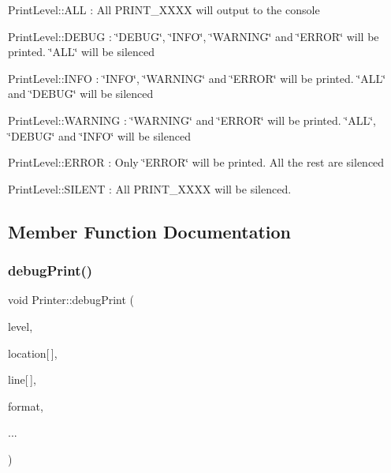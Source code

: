 \begin{DoxyItemize}
\item Print\+Level\+::\+A\+LL \+: All P\+R\+I\+N\+T\+\_\+\+X\+X\+XX will output to the console
\item Print\+Level\+::\+D\+E\+B\+UG \+: \char`\"{}\+D\+E\+B\+U\+G\char`\"{}, \char`\"{}\+I\+N\+F\+O\char`\"{}, \char`\"{}\+W\+A\+R\+N\+I\+N\+G\char`\"{} and \char`\"{}\+E\+R\+R\+O\+R\char`\"{} will be printed. \char`\"{}\+A\+L\+L\char`\"{} will be silenced
\item Print\+Level\+::\+I\+N\+FO \+: \char`\"{}\+I\+N\+F\+O\char`\"{}, \char`\"{}\+W\+A\+R\+N\+I\+N\+G\char`\"{} and \char`\"{}\+E\+R\+R\+O\+R\char`\"{} will be printed. \char`\"{}\+A\+L\+L\char`\"{} and \char`\"{}\+D\+E\+B\+U\+G\char`\"{} will be silenced
\item Print\+Level\+::\+W\+A\+R\+N\+I\+NG \+: \char`\"{}\+W\+A\+R\+N\+I\+N\+G\char`\"{} and \char`\"{}\+E\+R\+R\+O\+R\char`\"{} will be printed. \char`\"{}\+A\+L\+L\char`\"{}, \char`\"{}\+D\+E\+B\+U\+G\char`\"{} and \char`\"{}\+I\+N\+F\+O\char`\"{} will be silenced
\item Print\+Level\+::\+E\+R\+R\+OR \+: Only \char`\"{}\+E\+R\+R\+O\+R\char`\"{} will be printed. All the rest are silenced
\item Print\+Level\+::\+S\+I\+L\+E\+NT \+: All P\+R\+I\+N\+T\+\_\+\+X\+X\+XX will be silenced. 
\end{DoxyItemize}

\subsection{Member Function Documentation}
\mbox{\label{classov__core_1_1Printer_a5371993bfa709539ca870884f7c76f78}} 
\subsubsection{\texorpdfstring{debug\+Print()}{debugPrint()}}
{\footnotesize\ttfamily void Printer\+::debug\+Print (\begin{DoxyParamCaption}\item[{\hyperlink{classov__core_1_1Printer_a1c4c6c612ec6251afd91a1ddf933a0b2}{Print\+Level}}]{level,  }\item[{const char}]{location\mbox{[}$\,$\mbox{]},  }\item[{const char}]{line\mbox{[}$\,$\mbox{]},  }\item[{const char $\ast$}]{format,  }\item[{}]{... }\end{DoxyParamCaption})\hspace{0.3cm}{\ttfamily [static]}}



